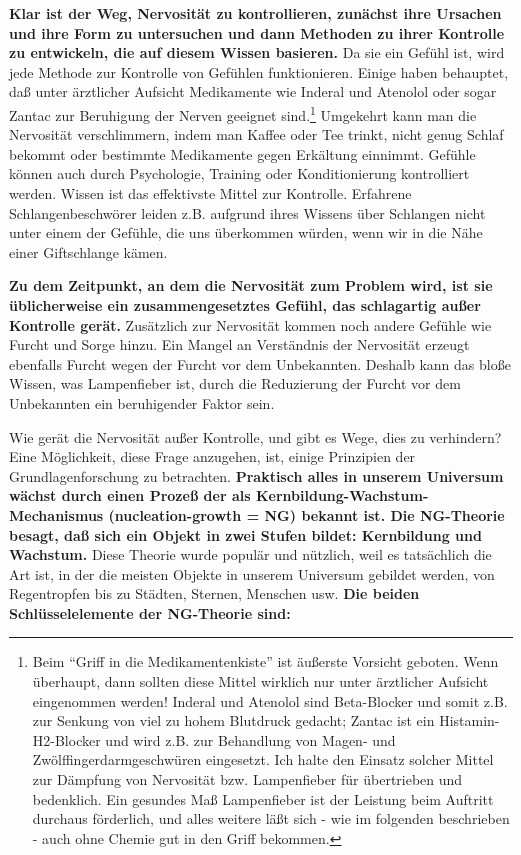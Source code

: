 \textbf{Klar ist der Weg, Nervosität zu kontrollieren, zunächst ihre Ursachen und ihre Form zu untersuchen und dann Methoden zu ihrer Kontrolle zu entwickeln, die auf diesem Wissen basieren.}
Da sie ein Gefühl ist, wird jede Methode zur Kontrolle von Gefühlen funktionieren.
Einige haben behauptet, daß unter ärztlicher Aufsicht Medikamente wie Inderal und Atenolol oder sogar Zantac zur Beruhigung der Nerven geeignet sind.\footnote{Beim \enquote{Griff in die Medikamentenkiste} ist äußerste Vorsicht geboten. Wenn überhaupt, dann sollten diese Mittel wirklich nur unter ärztlicher Aufsicht eingenommen werden! Inderal und Atenolol sind Beta-Blocker und somit z.B. zur Senkung von viel zu hohem Blutdruck gedacht; Zantac ist ein Histamin-H2-Blocker und wird z.B. zur Behandlung von Magen- und Zwölffingerdarmgeschwüren eingesetzt. Ich halte den Einsatz solcher Mittel zur Dämpfung von Nervosität bzw. Lampenfieber für übertrieben und bedenklich.
Ein gesundes Maß Lampenfieber ist der Leistung beim Auftritt durchaus förderlich, und alles weitere läßt sich - wie im folgenden beschrieben - auch ohne Chemie gut in den Griff bekommen.}
Umgekehrt kann man die Nervosität verschlimmern, indem man Kaffee oder Tee trinkt, nicht genug Schlaf bekommt oder bestimmte Medikamente gegen Erkältung einnimmt.
Gefühle können auch durch Psychologie, Training oder Konditionierung kontrolliert werden.
Wissen ist das effektivste Mittel zur Kontrolle.
Erfahrene Schlangenbeschwörer leiden z.B. aufgrund ihres Wissens über Schlangen nicht unter einem der Gefühle, die uns überkommen würden, wenn wir in die Nähe einer Giftschlange kämen.

\textbf{Zu dem Zeitpunkt, an dem die Nervosität zum Problem wird, ist sie üblicherweise ein zusammengesetztes Gefühl, das schlagartig außer Kontrolle gerät.}
Zusätzlich zur Nervosität kommen noch andere Gefühle wie Furcht und Sorge hinzu.
Ein Mangel an Verständnis der Nervosität erzeugt ebenfalls Furcht wegen der Furcht vor dem Unbekannten.
Deshalb kann das bloße Wissen, was Lampenfieber ist, durch die Reduzierung der Furcht vor dem Unbekannten ein beruhigender Faktor sein.


\label{ng}

Wie gerät die Nervosität außer Kontrolle, und gibt es Wege, dies zu verhindern?
Eine Möglichkeit, diese Frage anzugehen, ist, einige Prinzipien der Grundlagenforschung zu betrachten.
\textbf{Praktisch alles in unserem Universum wächst durch einen Prozeß der als Kernbildung-Wachstum-Mechanismus (nucleation-growth = NG) bekannt ist.
Die NG-Theorie besagt, daß sich ein Objekt in zwei Stufen bildet: Kernbildung und Wachstum.}
Diese Theorie wurde populär und nützlich, weil es tatsächlich die Art ist, in der die meisten Objekte in unserem Universum gebildet werden, von Regentropfen bis zu Städten, Sternen, Menschen usw.
\textbf{Die beiden Schlüsselelemente der NG-Theorie sind:}

